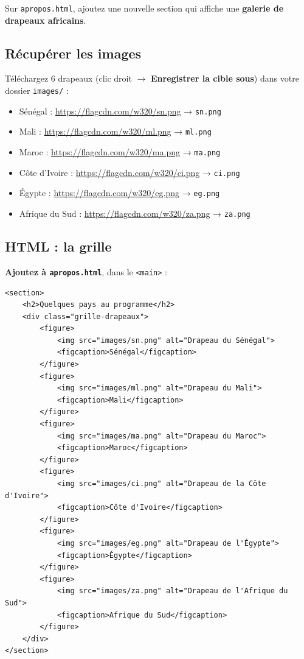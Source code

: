 \documentclass[11pt,a4paper]{article}
\begin{document}
Sur \texttt{apropos.html}, ajoutez une nouvelle section qui affiche une
\textbf{galerie de drapeaux africains}.

\subsection{Récupérer les images}

Téléchargez 6 drapeaux (clic droit $\to$ \textbf{Enregistrer la cible
sous}) dans votre dossier \texttt{images/} :

\begin{itemize}[leftmargin=*,nosep]
    \item Sénégal : \url{https://flagcdn.com/w320/sn.png} → \texttt{sn.png}
    \item Mali : \url{https://flagcdn.com/w320/ml.png} → \texttt{ml.png}
    \item Maroc : \url{https://flagcdn.com/w320/ma.png} → \texttt{ma.png}
    \item Côte d'Ivoire : \url{https://flagcdn.com/w320/ci.png} → \texttt{ci.png}
    \item Égypte : \url{https://flagcdn.com/w320/eg.png} → \texttt{eg.png}
    \item Afrique du Sud : \url{https://flagcdn.com/w320/za.png} → \texttt{za.png}
\end{itemize}

\subsection{HTML : la grille}

\textbf{Ajoutez à \texttt{apropos.html}}, dans le \texttt{<main>} :

\begin{lstlisting}[language=HTML5]
<section>
    <h2>Quelques pays au programme</h2>
    <div class="grille-drapeaux">
        <figure>
            <img src="images/sn.png" alt="Drapeau du Sénégal">
            <figcaption>Sénégal</figcaption>
        </figure>
        <figure>
            <img src="images/ml.png" alt="Drapeau du Mali">
            <figcaption>Mali</figcaption>
        </figure>
        <figure>
            <img src="images/ma.png" alt="Drapeau du Maroc">
            <figcaption>Maroc</figcaption>
        </figure>
        <figure>
            <img src="images/ci.png" alt="Drapeau de la Côte d'Ivoire">
            <figcaption>Côte d'Ivoire</figcaption>
        </figure>
        <figure>
            <img src="images/eg.png" alt="Drapeau de l'Égypte">
            <figcaption>Égypte</figcaption>
        </figure>
        <figure>
            <img src="images/za.png" alt="Drapeau de l'Afrique du Sud">
            <figcaption>Afrique du Sud</figcaption>
        </figure>
    </div>
</section>
\end{lstlisting}
\end{document}
